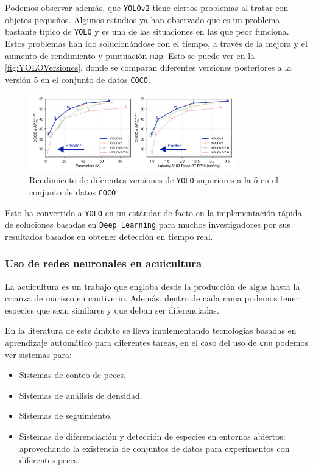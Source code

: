 Podemos observar además, que \texttt{YOLOv2} tiene ciertos problemas al tratar con objetos pequeños. Algunos estudios\cite{bhagyaOverviewDeepLearning2019} ya han observado que es un problema bastante típico de \texttt{YOLO} y es una de las situaciones en las que 
peor funciona.\newline
Estos problemas han ido solucionándose con el tiempo, a través de la mejora y el aumento de rendimiento y puntuación \texttt{\acrshort{map}}. Esto se puede ver en la \autoref{fig:YOLOVersiones}, donde se 
comparan diferentes versiones posteriores a la versión 5 en el conjunto de datos \texttt{COCO}.

\begin{figure}[H]
    \centering
    \includegraphics[width=0.8\textwidth]{images/4/YOLOVersiones.png}
    \caption{Rendimiento de diferentes versiones de \texttt{YOLO} superiores a la 5 en el conjunto de datos \texttt{COCO}\cite{ultralyticsYOLOv8}}
    \label{fig:YOLOVersiones}
\end{figure}

Esto ha convertido a \texttt{YOLO} en un estándar de facto en la implementación rápida de soluciones basadas en \texttt{Deep Learning} para muchos investigadores por sus resultados basados en obtener detección en tiempo real.

\subsubsection{Uso de redes neuronales en acuicultura}

La acuicultura es un trabajo que engloba desde la producción de algas hasta la crianza de marisco en cautiverio. Además, dentro de cada rama podemos tener especies que sean similares y que deban ser diferenciadas.

En la literatura de este ámbito se lleva implementando tecnologías basadas en aprendizaje automático para diferentes tareas, en el caso del uso de \texttt{\acrshort{cnn}} podemos ver sistemas para:
\begin{itemize}
    \item Sistemas de conteo de peces\cite{castillomoralSistemaConteoPeces2022}.
    \item Sistemas de análisis de densidad.
    \item Sistemas de seguimiento\cite{leeDetectionCatfishActivity2024}.
    \item Sistemas de diferenciación y detección de especies en entornos abiertos\cite{xiaSituSeaCucumber2018}\cite{ladeAutomatedFishSpecies2023}: aprovechando la existencia de conjuntos de datos
    \cite{ulucanLargeScaleDatasetFish2020} para experimentos con diferentes peces.
\end{itemize}

